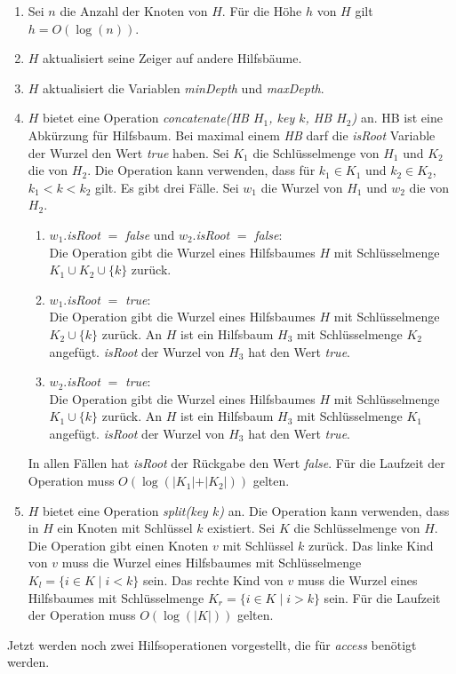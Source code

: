 \documentclass[a4paper,12pt]{article}
\begin{document}
\begin{enumerate}
	\item Sei $n$ die Anzahl der Knoten von $H$. Für die Höhe $h$ von $H$ gilt \mbox{$h = O\left(\log \left(n\right)\right)$}.
	\item $H$ aktualisiert seine Zeiger auf andere Hilfsbäume.
	\item $H$ aktualisiert die Variablen  \textit{minDepth} und \textit{maxDepth}.
	\item $H$ bietet eine Operation \textit{concatenate(HB $H_1$, key $k$, HB  $H_2$)} an. HB ist eine Abkürzung für Hilfsbaum. Bei maximal einem \textit{HB}  darf die \textit{isRoot} Variable der Wurzel den Wert \textit{true} haben. Sei $K_1$ die Schlüsselmenge von $H_1$ und $K_2$ die von $H_2$. Die Operation kann verwenden, dass für $k_1 \in K_1$ und $k_2 \in K_2$, $k_1 < k < k_2$ gilt. Es gibt drei Fälle. Sei $w_1$ die Wurzel von $H_1$ und $w_2$ die von $H_2$.
	\begin{enumerate}
		\item $w_1$.\textit{isRoot} $=$ \textit{false} und $w_2$.\textit{isRoot} $=$ \textit{false}:\\
		Die Operation gibt die Wurzel eines Hilfsbaumes $H$ mit Schlüsselmenge $K_1 \cup K_2 \cup \{k\} $ zurück.
		\item $w_1$.\textit{isRoot} $=$ \textit{true}:\\	
		Die Operation gibt die Wurzel eines Hilfsbaumes $H$ mit Schlüsselmenge $K_2 \cup \{k\} $ zurück. An $H$ ist ein Hilfsbaum $H_3$ mit Schlüsselmenge $K_2$ angefügt. \textit{isRoot} der Wurzel von $H_3$ hat den Wert \textit{true}.
		\item $w_2$.\textit{isRoot} $=$ \textit{true}:\\	
		Die Operation gibt die Wurzel eines Hilfsbaumes $H$ mit Schlüsselmenge $K_1 \cup \{k\} $ zurück. An $H$ ist ein Hilfsbaum $H_3$ mit Schlüsselmenge $K_1$ angefügt. \textit{isRoot} der Wurzel von $H_3$ hat den Wert \textit{true}.	 
	\end{enumerate}
	In allen Fällen hat \textit{isRoot} der Rückgabe den Wert \textit{false}.
	Für die Laufzeit der Operation muss $O\left(\log \left(\vert K_1 \vert + \vert K_2 \vert\right)\right)$ gelten.
	\item $H$ bietet eine Operation \textit{split(key $k$)} an. Die Operation kann verwenden, dass in $H$ ein Knoten mit Schlüssel $k$ existiert. Sei $K$ die Schlüsselmenge von $H$. Die Operation gibt einen Knoten $v$ mit Schlüssel $k$ zurück. Das linke Kind von $v$ muss die Wurzel eines Hilfsbaumes mit Schlüsselmenge ${K_l=\{i\in K \mid  i <k\}}$ sein. Das rechte Kind von $v$ muss die Wurzel eines Hilfsbaumes mit Schlüsselmenge ${K_r=\{i\in K \mid  i > k\}}$ sein. Für die Laufzeit der Operation muss $O\left(\log \left(\vert K \vert\right) \right)$ gelten.
\end{enumerate} 
Jetzt werden noch zwei Hilfsoperationen vorgestellt, die für \textit{access} benötigt werden.\\
\end{document}
